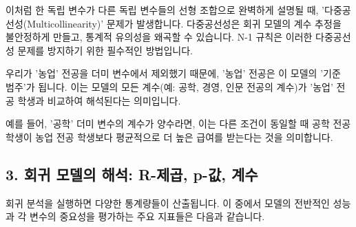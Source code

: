 \documentclass[11pt,a4paper]{article}
\begin{document}
이처럼 한 독립 변수가 다른 독립 변수들의 선형 조합으로 완벽하게 설명될 때, '다중공선성(Multicollinearity)' 문제가 발생합니다. 다중공선성은 회귀 모델의 계수 추정을 불안정하게 만들고, 통계적 유의성을 왜곡할 수 있습니다. N-1 규칙은 이러한 다중공선성 문제를 방지하기 위한 필수적인 방법입니다.

\begin{tcolorbox}[example={기준 범주의 역할}]
우리가 '농업' 전공을 더미 변수에서 제외했기 때문에, '농업' 전공은 이 모델의 '기준 범주'가 됩니다. 이는 모델의 모든 계수(예: 공학, 경영, 인문 전공의 계수)가 '농업' 전공 학생과 비교하여 해석된다는 의미입니다.

예를 들어, '공학' 더미 변수의 계수가 양수라면, 이는 다른 조건이 동일할 때 공학 전공 학생이 농업 전공 학생보다 평균적으로 더 높은 급여를 받는다는 것을 의미합니다.
\end{tcolorbox}

\subsection*{3. 회귀 모델의 해석: R-제곱, p-값, 계수}

회귀 분석을 실행하면 다양한 통계량들이 산출됩니다. 이 중에서 모델의 전반적인 성능과 각 변수의 중요성을 평가하는 주요 지표들은 다음과 같습니다.
\end{document}
